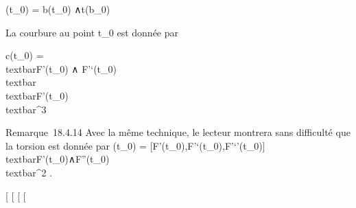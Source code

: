 \documentclass[]{article}
\begin{document}
\vecn(t\_0) =\vec
b(t\_0) ∧\vec t(b\_0)

La courbure au point t\_0 est donnée par

c(t\_0) = \\textbar{}F'(t\_0) ∧
F'`(t\_0)\\textbar{} \over
\\textbar{}F'(t\_0)\\textbar{}^3

Remarque~18.4.14 Avec la même technique, le lecteur montrera sans
difficulté que la torsion est donnée par \tau(t\_0) =
{[}F'(t\_0),F'`(t\_0),F'`'(t\_0){]}
\over
\\textbar{}F'(t\_0)∧F''(t\_0)\\textbar{}^2
.

{[}
{[}
{[}
{[}
\end{document}
